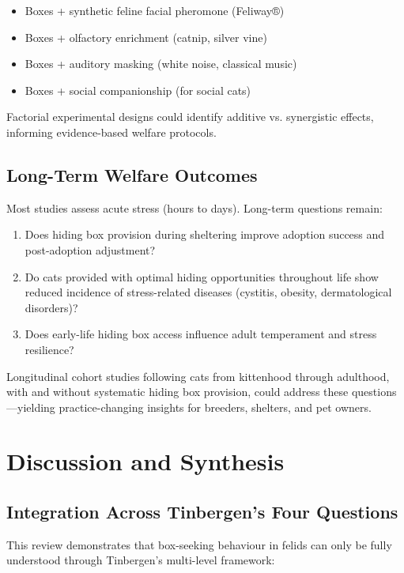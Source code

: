 \documentclass[12pt,a4paper]{article}
\begin{document}
\begin{itemize}
    \item Boxes + synthetic feline facial pheromone (Feliway®)
    \item Boxes + olfactory enrichment (catnip, silver vine)
    \item Boxes + auditory masking (white noise, classical music)
    \item Boxes + social companionship (for social cats)
\end{itemize}

Factorial experimental designs could identify additive vs. synergistic effects, informing evidence-based welfare protocols.

\subsection{Long-Term Welfare Outcomes}

Most studies assess acute stress (hours to days). Long-term questions remain:

\begin{enumerate}
    \item Does hiding box provision during sheltering improve adoption success and post-adoption adjustment?
    \item Do cats provided with optimal hiding opportunities throughout life show reduced incidence of stress-related diseases (cystitis, obesity, dermatological disorders)?
    \item Does early-life hiding box access influence adult temperament and stress resilience?
\end{enumerate}

Longitudinal cohort studies following cats from kittenhood through adulthood, with and without systematic hiding box provision, could address these questions—yielding practice-changing insights for breeders, shelters, and pet owners.

\section{Discussion and Synthesis}

\subsection{Integration Across Tinbergen's Four Questions}

This review demonstrates that box-seeking behaviour in felids can only be fully understood through Tinbergen's multi-level framework:
\end{document}
